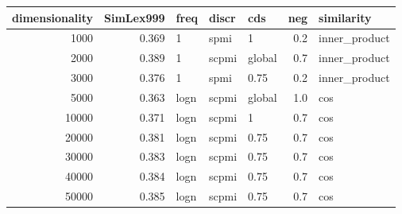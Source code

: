\begin{tabular}{rrlllrl}
\toprule
 dimensionality &  SimLex999 &  freq &  discr &     cds &  neg &     similarity \\
\midrule
           1000 &      0.369 &     1 &   spmi &       1 &  0.2 &  inner\_product \\
           2000 &      0.389 &     1 &  scpmi &  global &  0.7 &  inner\_product \\
           3000 &      0.376 &     1 &   spmi &    0.75 &  0.2 &  inner\_product \\
           5000 &      0.363 &  logn &  scpmi &  global &  1.0 &            cos \\
          10000 &      0.371 &  logn &  scpmi &       1 &  0.7 &            cos \\
          20000 &      0.381 &  logn &  scpmi &    0.75 &  0.7 &            cos \\
          30000 &      0.383 &  logn &  scpmi &    0.75 &  0.7 &            cos \\
          40000 &      0.384 &  logn &  scpmi &    0.75 &  0.7 &            cos \\
          50000 &      0.385 &  logn &  scpmi &    0.75 &  0.7 &            cos \\
\bottomrule
\end{tabular}

